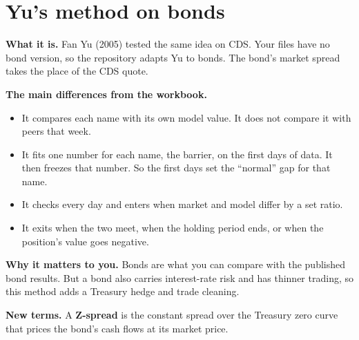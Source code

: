 \documentclass[11pt]{article}
\newcommand{\term}[1]{\textbf{#1}}
\begin{document}
\section{Yu's method on bonds}\label{sec:yu}

\begin{plainbox}
\term{What it is.} Fan Yu (2005) tested the same idea on CDS. Your files have no bond version, so the repository adapts Yu to bonds. The bond's market spread takes the place of the CDS quote.

\term{The main differences from the workbook.}
\begin{itemize}[leftmargin=1.2em,nosep]
\item It compares each name with its own model value. It does not compare it with peers that week.
\item It fits one number for each name, the barrier, on the first days of data. It then freezes that number. So the first days set the ``normal'' gap for that name.
\item It checks every day and enters when market and model differ by a set ratio.
\item It exits when the two meet, when the holding period ends, or when the position's value goes negative.
\end{itemize}

\term{Why it matters to you.} Bonds are what you can compare with the published bond results. But a bond also carries interest-rate risk and has thinner trading, so this method adds a Treasury hedge and trade cleaning.

\term{New terms.} A \term{Z-spread} is the constant spread over the Treasury zero curve that prices the bond's cash flows at its market price.
\end{plainbox}
\end{document}
